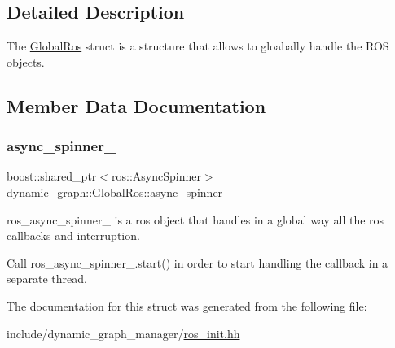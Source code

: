 \subsection{Detailed Description}
The \hyperlink{structdynamic__graph_1_1GlobalRos}{Global\+Ros} struct is a structure that allows to gloabally handle the R\+OS objects. 

\subsection{Member Data Documentation}
\mbox{\label{structdynamic__graph_1_1GlobalRos_a9ad45d4ac3a50e943d3f2cb24f8281a3}} 
\subsubsection{\texorpdfstring{async\+\_\+spinner\+\_\+}{async\_spinner\_}}
{\footnotesize\ttfamily boost\+::shared\+\_\+ptr$<$ros\+::\+Async\+Spinner$>$ dynamic\+\_\+graph\+::\+Global\+Ros\+::async\+\_\+spinner\+\_\+}



ros\+\_\+async\+\_\+spinner\+\_\+ is a ros object that handles in a global way all the ros callbacks and interruption. 

Call ros\+\_\+async\+\_\+spinner\+\_\+.\+start() in order to start handling the callback in a separate thread. 

The documentation for this struct was generated from the following file\+:\begin{DoxyCompactItemize}
\item 
include/dynamic\+\_\+graph\+\_\+manager/\hyperlink{ros__init_8hh}{ros\+\_\+init.\+hh}\end{DoxyCompactItemize}
